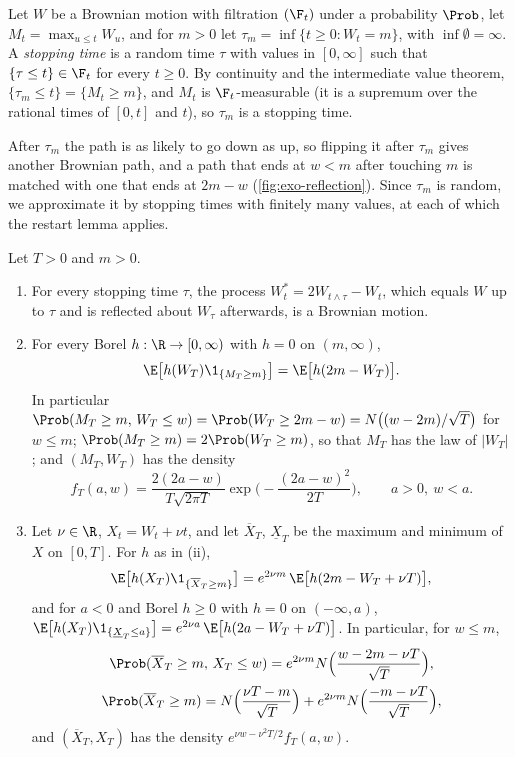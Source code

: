 Let $W$ be a Brownian motion with filtration $(\F_t)$ under a probability $\Prob$, let
$M_t=\max_{u\le t}W_u$, and for $m>0$ let $\tau_m=\inf\{t\ge0:W_t=m\}$, with
$\inf\emptyset=\infty$. A \emph{stopping time} is a random time $\tau$ with values in
$[0,\infty]$ such that $\{\tau\le t\}\in\F_t$ for every $t\ge0$. By continuity and the
intermediate value theorem, $\{\tau_m\le t\}=\{M_t\ge m\}$, and $M_t$ is $\F_t$-measurable
(it is a supremum over the rational times of $[0,t]$ and $t$), so $\tau_m$ is a stopping time.

After $\tau_m$ the path is as likely to go down as up, so flipping it after $\tau_m$ gives another
Brownian path, and a path that ends at $w<m$ after touching $m$ is matched with one that ends at
$2m-w$ (\cref{fig:exo-reflection}). Since $\tau_m$ is random, we approximate it by stopping times
with finitely many values, at each of which the restart lemma applies.

\begin{theorem}\label{thm:exo-reflection}
Let $T>0$ and $m>0$.
\begin{enumerate}[label=(\roman*)]
  \item For every stopping time $\tau$, the process $W^*_t=2W_{t\wedge\tau}-W_t$, which
    equals $W$ up to $\tau$ and is reflected about $W_\tau$ afterwards, is a Brownian motion.
  \item For every Borel $h:\R\to[0,\infty)$ with $h=0$ on $(m,\infty)$,
    \begin{equation}\label{eq:exo-reflection}
      \E\big[h(W_T)\1_{\{M_T\ge m\}}\big]=\E\big[h(2m-W_T)\big].
    \end{equation}
    In particular $\Prob(M_T\ge m,\,W_T\le w)=\Prob(W_T\ge2m-w)=N\big((w-2m)/\sqrt T\big)$ for
    $w\le m$; $\Prob(M_T\ge m)=2\Prob(W_T\ge m)$, so that $M_T$ has the law of $|W_T|$; and
    $(M_T,W_T)$ has the density
    \[
      f_T(a,w)=\frac{2(2a-w)}{T\sqrt{2\pi T}}\exp\Big(-\frac{(2a-w)^2}{2T}\Big),\qquad a>0,\ w<a .
    \]
  \item Let $\nu\in\R$, $X_t=W_t+\nu t$, and let $\overline X_T$, $\underline X_T$ be the maximum
    and minimum of $X$ on $[0,T]$. For $h$ as in (ii),
    \begin{equation}\label{eq:exo-reflection-drift}
      \E\big[h(X_T)\1_{\{\overline X_T\ge m\}}\big]=e^{2\nu m}\,\E\big[h(2m-W_T+\nu T)\big],
    \end{equation}
    and for $a<0$ and Borel $h\ge0$ with $h=0$ on $(-\infty,a)$,
    $\E\big[h(X_T)\1_{\{\underline X_T\le a\}}\big]=e^{2\nu a}\,\E\big[h(2a-W_T+\nu T)\big]$. In
    particular, for $w\le m$,
    \begin{gather*}
      \Prob(\overline X_T\ge m,\,X_T\le w)=e^{2\nu m}N\Big(\frac{w-2m-\nu T}{\sqrt T}\Big),\\
      \Prob(\overline X_T\ge m)=N\Big(\frac{\nu T-m}{\sqrt T}\Big)+e^{2\nu m}N\Big(\frac{-m-\nu T}{\sqrt T}\Big),
    \end{gather*}
    and $(\overline X_T,X_T)$ has the density $e^{\nu w-\nu^2T/2}f_T(a,w)$.
\end{enumerate}
\end{theorem}

